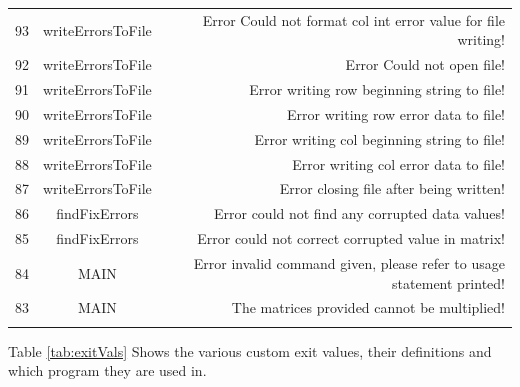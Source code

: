 \documentclass{article}
\begin{document}
\begin{table}[H]
\begin{tabulary}{\linewidth}{LCR}
            93 & writeErrorsToFile & Error Could not format col int error value for file writing! \\
            92 & writeErrorsToFile & Error Could not open file! \\
            91 & writeErrorsToFile & Error writing row beginning string to file! \\
            90 & writeErrorsToFile & Error writing row error data to file! \\
            89 & writeErrorsToFile & Error writing col beginning string to file! \\
            88 & writeErrorsToFile & Error writing col error data to file! \\
            87 & writeErrorsToFile & Error closing file after being written! \\
            86 & findFixErrors & Error could not find any corrupted data values! \\
            85 & findFixErrors & Error could not correct corrupted value in matrix! \\
            84 & MAIN & Error invalid command given, please refer to usage statement printed! \\
            83 & MAIN & The matrices provided cannot be multiplied! \\
            \\
            \hline
        \end{tabulary}
    \end{table}

    Table \ref{tab:exitVals} Shows the various custom exit values, their definitions and which program they are used in.
    
\end{document}
